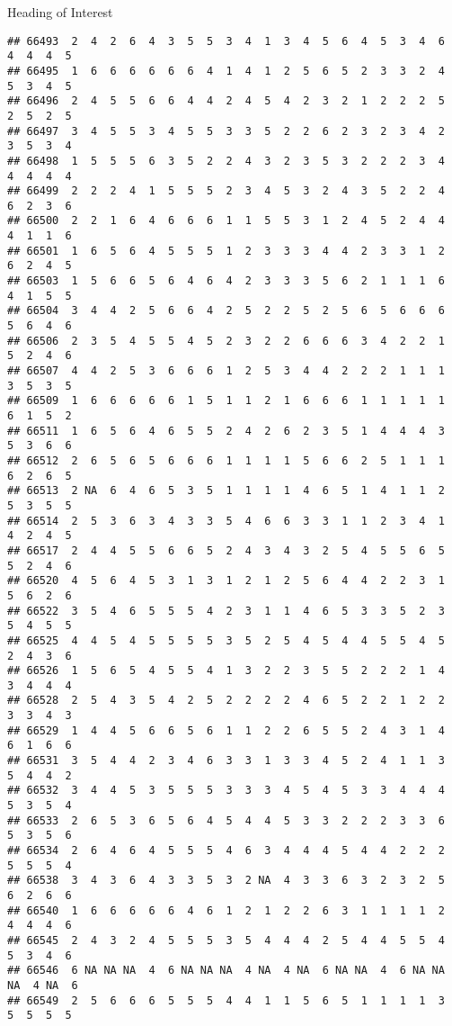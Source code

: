 \documentclass[
  ignorenonframetext,
]{beamer}
\begin{document}
\begin{frame}[fragile]{Heading of Interest}
\begin{verbatim}
## 66493  2  4  2  6  4  3  5  5  3  4  1  3  4  5  6  4  5  3  4  6  4  4  4  5
## 66495  1  6  6  6  6  6  6  4  1  4  1  2  5  6  5  2  3  3  2  4  5  3  4  5
## 66496  2  4  5  5  6  6  4  4  2  4  5  4  2  3  2  1  2  2  2  5  2  5  2  5
## 66497  3  4  5  5  3  4  5  5  3  3  5  2  2  6  2  3  2  3  4  2  3  5  3  4
## 66498  1  5  5  5  6  3  5  2  2  4  3  2  3  5  3  2  2  2  3  4  4  4  4  4
## 66499  2  2  2  4  1  5  5  5  2  3  4  5  3  2  4  3  5  2  2  4  6  2  3  6
## 66500  2  2  1  6  4  6  6  6  1  1  5  5  3  1  2  4  5  2  4  4  4  1  1  6
## 66501  1  6  5  6  4  5  5  5  1  2  3  3  3  4  4  2  3  3  1  2  6  2  4  5
## 66503  1  5  6  6  5  6  4  6  4  2  3  3  3  5  6  2  1  1  1  6  4  1  5  5
## 66504  3  4  4  2  5  6  6  4  2  5  2  2  5  2  5  6  5  6  6  6  5  6  4  6
## 66506  2  3  5  4  5  5  4  5  2  3  2  2  6  6  6  3  4  2  2  1  5  2  4  6
## 66507  4  4  2  5  3  6  6  6  1  2  5  3  4  4  2  2  2  1  1  1  3  5  3  5
## 66509  1  6  6  6  6  6  1  5  1  1  2  1  6  6  6  1  1  1  1  1  6  1  5  2
## 66511  1  6  5  6  4  6  5  5  2  4  2  6  2  3  5  1  4  4  4  3  5  3  6  6
## 66512  2  6  5  6  5  6  6  6  1  1  1  1  5  6  6  2  5  1  1  1  6  2  6  5
## 66513  2 NA  6  4  6  5  3  5  1  1  1  1  4  6  5  1  4  1  1  2  5  3  5  5
## 66514  2  5  3  6  3  4  3  3  5  4  6  6  3  3  1  1  2  3  4  1  4  2  4  5
## 66517  2  4  4  5  5  6  6  5  2  4  3  4  3  2  5  4  5  5  6  5  5  2  4  6
## 66520  4  5  6  4  5  3  1  3  1  2  1  2  5  6  4  4  2  2  3  1  5  6  2  6
## 66522  3  5  4  6  5  5  5  4  2  3  1  1  4  6  5  3  3  5  2  3  5  4  5  5
## 66525  4  4  5  4  5  5  5  5  3  5  2  5  4  5  4  4  5  5  4  5  2  4  3  6
## 66526  1  5  6  5  4  5  5  4  1  3  2  2  3  5  5  2  2  2  1  4  3  4  4  4
## 66528  2  5  4  3  5  4  2  5  2  2  2  2  4  6  5  2  2  1  2  2  3  3  4  3
## 66529  1  4  4  5  6  6  5  6  1  1  2  2  6  5  5  2  4  3  1  4  6  1  6  6
## 66531  3  5  4  4  2  3  4  6  3  3  1  3  3  4  5  2  4  1  1  3  5  4  4  2
## 66532  3  4  4  5  3  5  5  5  3  3  3  4  5  4  5  3  3  4  4  4  5  3  5  4
## 66533  2  6  5  3  6  5  6  4  5  4  4  5  3  3  2  2  2  3  3  6  5  3  5  6
## 66534  2  6  4  6  4  5  5  5  4  6  3  4  4  4  5  4  4  2  2  2  5  5  5  4
## 66538  3  4  3  6  4  3  3  5  3  2 NA  4  3  3  6  3  2  3  2  5  6  2  6  6
## 66540  1  6  6  6  6  6  4  6  1  2  1  2  2  6  3  1  1  1  1  2  4  4  4  6
## 66545  2  4  3  2  4  5  5  5  3  5  4  4  4  2  5  4  4  5  5  4  5  3  4  6
## 66546  6 NA NA NA  4  6 NA NA NA  4 NA  4 NA  6 NA NA  4  6 NA NA NA  4 NA  6
## 66549  2  5  6  6  6  5  5  5  4  4  1  1  5  6  5  1  1  1  1  3  5  5  5  5

\end{verbatim}
\end{frame}
\end{document}
